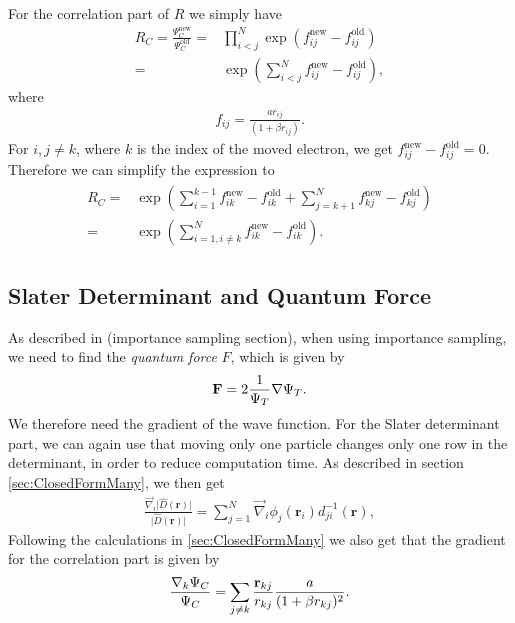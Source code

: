 \documentclass[../main.tex]{subfiles}
\begin{document}
For the correlation part of $R$ we simply have 
\begin{align}
    R_{C} = \frac{\Psi_C^{\textrm{new}}}{\Psi_C^{\textrm{old}}}
    =& \prod_{i<j}^{N} \exp\left(f_{ij}^{\textrm{new}} - f_{ij}^{\textrm{old}}\right)\\
    =& \exp\left(\sum_{i<j}^{N} f_{ij}^{\textrm{new}} - f_{ij}^{\textrm{old}}\right),
\end{align}
where 
\begin{align}
    f_{ij} = \frac{a r_{ij}}{(1+\beta r_{ij})}.
\end{align}
For $i,j \neq k$, where $k$ is the index of the moved electron, we get $f_{ij}^{\textrm{new}} - f_{ij}^{\textrm{old}} = 0$. Therefore we can simplify the expression to 
\begin{align}\label{eq:MetropolisRatioC}
\begin{split}
    R_{C} =& \exp\left(\sum_{i=1}^{k-1} f_{ik}^{\textrm{new}} - f_{ik}^{\textrm{old}} + \sum_{j=k+1}^{N} f_{kj}^{\textrm{new}} - f_{kj}^{\textrm{old}}\right)\\
    =& \exp\left(\sum_{i=1, i\neq k}^{N} f_{ik}^{\textrm{new}} - f_{ik}^{\textrm{old}}\right).
\end{split}
\end{align}

\subsection{Slater Determinant and Quantum Force}
As described in (importance sampling section), when using importance sampling, we need to find the \textit{quantum force} $F$, which is given by
\begin{align}
    {\bf F} = 2 \frac{1}{\Psi_T} \nabla \Psi_T.
\end{align}
We therefore need the gradient of the wave function. For the Slater determinant part, we can again use that moving only one particle changes only one row in the determinant, in order to reduce computation time. As described in section \ref{sec:ClosedFormMany}, we then get
\begin{align}
    \frac{\vec\nabla_i\vert\hat{D}(\mathbf{r})\vert}{\vert\hat{D}(\mathbf{r})\vert} =
    \sum_{j=1}^N \vec\nabla_i \phi_j(\mathbf{r}_i)d_{ji}^{-1}(\mathbf{r}),
\end{align}
Following the calculations in \ref{sec:ClosedFormMany} we also get that the gradient for the correlation part is given by 
\begin{align}
    \frac{ \nabla_k \Psi_C}{ \Psi_C } = \sum_{j\ne k}\frac{{\bf r}_{kj}}{r_{kj}}\frac{a}{(1+\beta r_{kj})^2}.
\end{align}
\end{document}
